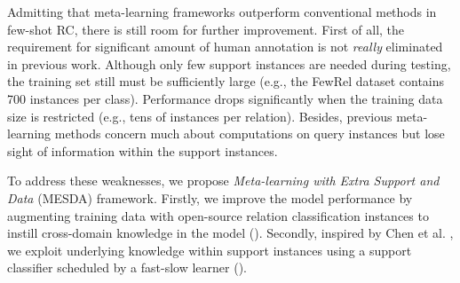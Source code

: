 Admitting that meta-learning frameworks outperform conventional methods in few-shot RC, there is still room for further improvement.
First of all, the requirement for significant amount of human annotation is not \emph{really} eliminated in previous work. Although only few support instances are needed during testing, the training set still must be sufficiently large (e.g., the FewRel dataset \cite{han-etal-2018-fewrel} contains 700 instances per class). Performance drops significantly when the training data size is restricted (e.g., tens of instances per relation). Besides, previous meta-learning methods concern much about computations on query instances but lose sight of information within the support instances.

To address these weaknesses, we propose
\emph{Meta-learning with Extra Support and Data} (MESDA) framework.
Firstly, we improve the model performance by augmenting training data with open-source relation classification instances to instill cross-domain knowledge in the model ().
Secondly, inspired by Chen et al. , we exploit underlying knowledge within support instances using a support classifier scheduled by a fast-slow learner ().

